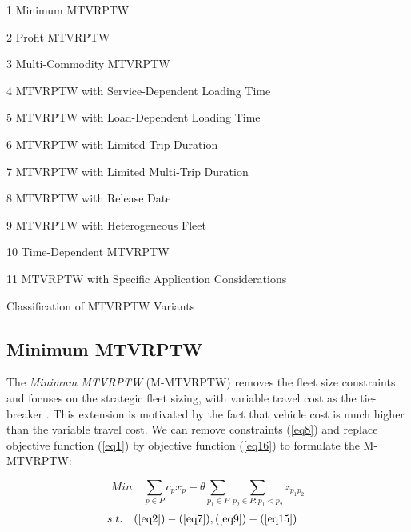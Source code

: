 \documentclass[11pt]{article}
\begin{document}
\begin{table}[]
\begin{threeparttable}
\begin{tablenotes}
        \item[1] Minimum MTVRPTW 
        \item[2] Profit MTVRPTW
        \item[3] Multi-Commodity MTVRPTW
        \item[4] MTVRPTW with Service-Dependent Loading Time 
        \item[5] MTVRPTW with Load-Dependent Loading Time 
        \item[6] MTVRPTW with Limited Trip Duration
        \item[7] MTVRPTW with Limited Multi-Trip Duration
        \item[8] MTVRPTW with Release Date
        \item[9] MTVRPTW with Heterogeneous Fleet
        \item[10] Time-Dependent MTVRPTW
        \item[11] MTVRPTW with Specific Application Considerations
    \end{tablenotes}
    \caption{Classification of MTVRPTW Variants}
    \label{table:1}
    \end{threeparttable}
\end{table}

\subsection{Minimum MTVRPTW}
\label{subsec:minimum}

The \textit{Minimum MTVRPTW} (M-MTVRPTW) removes the fleet size constraints and focuses on the strategic fleet sizing, with variable travel cost as the tie-breaker \cite[e.g.,][]{battarra2009adaptive, cattaruzza2014iterated}.  This extension is motivated by the fact that vehicle cost is much higher than the variable travel cost.  We can remove constraints (\ref{eq8}) and replace objective function (\ref{eq1}) by objective function (\ref{eq16}) to formulate the M-MTVRPTW:

\begin{equation}
Min \quad
    \sum_{p \in P} c_p x_p - \theta \sum_{p_1 \in P} \sum_{p_2 \in P : p_1 < p_2} z_{{p_1}{p_2}} \label{eq16}
\end{equation}
\begin{align}
s.t. \quad (\ref{eq2})-(\ref{eq7})&, (\ref{eq9})-(\ref{eq15}) \nonumber
\end{align}
\end{document}
